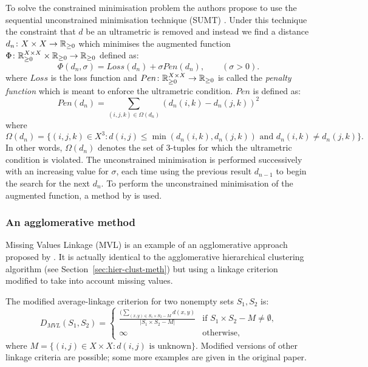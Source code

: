 To solve the constrained minimisation problem the authors propose to use the
sequential unconstrained minimisation technique (SUMT)
\cite{fiacco1964sequential}.  Under this technique the constraint that $d$ be
an ultrametric is removed and instead we find a distance $d_n \colon X \times
X \to {\mathbb R}_{\geq 0}$ which minimises the augmented function $\Phi \colon {\mathbb R}_{\geq 0}^{X
  \times X} \times {\mathbb R}_{\geq 0} \to {\mathbb R}_{\geq 0}$ defined as:
\begin{equation*}
  \label{eq:partial-dist-optimisation}
  \Phi(d_n,\sigma) = Loss(d_n) + \sigma Pen(d_n), \qquad (\sigma > 0).
\end{equation*}
where $Loss$ is the loss function and $Pen \colon {\mathbb R}_{\geq 0}^{X \times X} \to
{\mathbb R}_{\geq 0}$ is called the \textit{penalty function} which is meant to enforce the
ultrametric condition.  $Pen$ is defined as:
\begin{equation*}
  \label{eq:penalty-function}
  Pen(d_n) = \sum_{(i,j,k) \in \Omega(d_n)} (d_n(i,k) - d_n(j,k))^2
\end{equation*}
where
\begin{equation*}
  \Omega(d_n) = \{(i,j,k) \in X^3 \colon d(i,j) \leq \min(d_n(i,k),d_n(j,k))
  \text{ and } d_n(i,k) \neq d_n(j,k)\}.
\end{equation*}
In other words, $\Omega(d_n)$ denotes the set of $3$-tuples for which the
ultrametric condition is violated.  The unconstrained minimisation is
performed successively with an increasing value for $\sigma$, each time using
the previous result $d_{n-1}$ to begin the search for the next $d_n$.  To
perform the unconstrained minimisation of the augmented function, a method by
\cite{powell1977restart} is used.

\subsubsection{An agglomerative method}
\label{sec:part-dist-agglom-method}

Missing Values Linkage (MVL) is an example of an agglomerative approach
proposed by \cite{schader1992mvl}.  It is actually identical to the
agglomerative hierarchical clustering algorithm (see
Section~\ref{sec:hier-clust-meth}) but using a linkage criterion modified to
take into account missing values.

The modified
average-linkage criterion for two nonempty sets $S_1, S_2$ is:
\begin{equation*}
  D_{MVL}(S_1,S_2) =
  \begin{cases}
    \displaystyle
    \frac{\displaystyle (\sum_{(x,y) \in S_1 \times S_2 - M} d(x,y)}
         {|S_1 \times S_2 - M|} & \text{if $S_1
      \times S_2 - M \neq \emptyset$,} \\
    \infty & \text{otherwise},
  \end{cases}
\end{equation*}
where $M = \{(i,j) \in X \times X \colon d(i,j) \text{ is unknown}\}$.
Modified versions of other linkage criteria are possible; some more examples
are given in the original paper.

